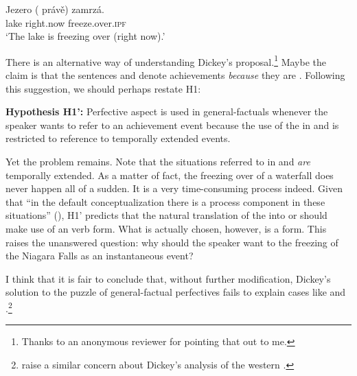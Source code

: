 \documentclass[output=paper,modfonts,newtxmath,hidelinks]{langscibook}
\begin{document}
\begin{exe}
\ex\label{13:jezoro}
\gll Jezero (\hspace{-2pt} pr\'av\v{e}) zamrz\'a. \\
lake {} right.now freeze.over.\textsc{ipf} \\
\glt `The lake is freezing over (right now).'
\end{exe}

\noindent There is an alternative way of understanding Dickey's proposal.\footnote{Thanks to an anonymous reviewer for pointing that out to me.} Maybe the claim is that 
the sentences  and  denote achievements \textit{because} they are . 
Following this suggestion, we should perhaps restate H1:  
\begin{exe}
\ex\label{13:hypo1bar}
\textbf{Hypothesis H1':} Perfective aspect is used in general-factuals whenever the speaker wants to refer to an achievement event because the use of the  in  and  is restricted to reference to temporally extended events.
\end{exe}

\noindent Yet the problem remains. Note that the situations referred to in  and  \textit{are} temporally extended. As a matter of fact, the freezing over of a waterfall does never happen all of a sudden. It is a very time-consuming process indeed. Given that ``in the default conceptualization there is a process component in these situations'' (\citealt[78]{Dickey18}), H1' predicts that the natural translation of the   into  or  should make use of an  verb form. What is actually chosen, however, is a  form. This raises the unanswered question: why should the speaker want to  the freezing of the Niagara Falls as an instantaneous event?    

I think that it is fair to conclude that, without further modification, Dickey's solution to the puzzle of general-factual perfectives fails to explain cases like  and .\footnote{\citet{FK15} raise a similar concern about Dickey's analysis of the western .}
\end{document}
